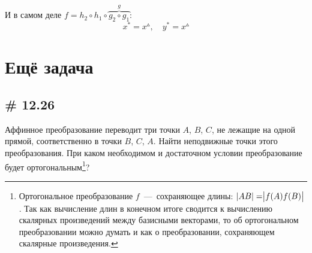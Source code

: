 \documentclass[a4paper,12pt]{article}
\begin{document}
\begin{solution}
    И в самом деле $f = h_2 \circ h_1 \circ \overbrace{g_2 \circ g_1}^g$:
    \[
      x^* = x^{\vartriangle},\quad y^* = x^{\vartriangle}
    \]
  \end{solution}

  
  
  \section{Ещё задача}
  
  
  \subsection{\# 12.26}
  
  Аффинное преобразование переводит три точки $A$, $B$, $C$, не лежащие на одной прямой, соответственно в точки $B$, $C$, $A$.
  Найти неподвижные точки этого преобразования.
  При каком необходимом и достаточном условии преобразование будет ортогональным\footnote{Ортогональное преобразование $f$~---~сохраняющее длины: $|AB| \hm= \bigr|f(A)f(B)\bigl|$. Так как вычисление длин в конечном итоге сводится к вычислению скалярных произведений между базисными векторами, то об ортогональном преобразовании можно думать и как о преобразовании, сохраняющем скалярные произведения.}?
  
\end{document}
